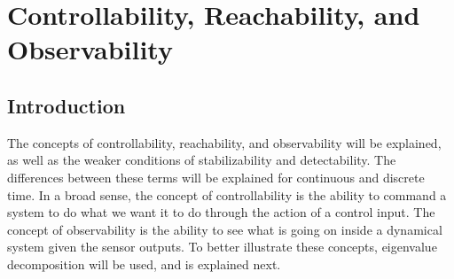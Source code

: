 



\section{Controllability, Reachability, and Observability}

\subsection{Introduction}

The concepts of controllability, reachability, and observability will be explained, as well as the weaker conditions of stabilizability and detectability.
The differences between these terms will be explained for continuous and discrete time.
In a broad sense, the concept of controllability is the ability to command a system to do what we want it to do through the action of a control input.
The concept of observability is the ability to see what is going on inside a dynamical system given the sensor outputs.
To better illustrate these concepts, eigenvalue decomposition will be used, and is explained next.

